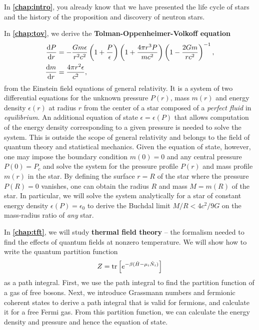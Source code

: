 In \textbf{\cref{chap:intro}}, you already know that we have presented the life cycle of stars and the history of the proposition and discovery of neutron stars.

In \textbf{\cref{chap:tov}}, we derive the \textbf{Tolman-Oppenheimer-Volkoff equation}
\begin{align*}
	\odv{P}{r} &= -\frac{G m \epsilon}{r^2 c^2} \left( 1 + \frac{P}{\epsilon} \right) \left( 1 + \frac{4 \pi r^3 P}{m c^2} \right) \left( 1 - \frac{2 G m}{r c^2} \right)^{-1} , \\
	\odv{m}{r} &= \frac{4 \pi r^2 \epsilon}{c^2} ,
\end{align*}
from the Einstein field equations of general relativity.
It is a system of two differential equations for the unknown pressure $P(r)$, mass $m(r)$ and energy density $\epsilon(r)$ at radius $r$ from the center of a star composed of a \emph{perfect fluid} in \emph{equilibrium}.
An additional equation of state $\epsilon = \epsilon(P)$ that allows computation of the energy density corresponding to a given pressure is needed to solve the system.
This is outside the scope of general relativity and belongs to the field of quantum theory and statistical mechanics.
Given the equation of state, however, one may impose the boundary condition $m(0) = 0$ and any central pressure $P(0) = P_c$ and solve the system for the pressure profile $P(r)$ and mass profile $m(r)$ in the star.
By defining the surface $r=R$ of the star where the pressure $P(R) = 0$ vanishes, one can obtain the radius $R$ and mass $M = m(R)$ of the star.
In particular, we will solve the system analytically for a star of constant energy density $\epsilon(P) = \epsilon_0$ to derive the Buchdal limit $M/R < 4 c^2 / 9 G$ on the mass-radius ratio of \emph{any} star.

In \textbf{\cref{chap:tft}}, we will study \textbf{thermal field theory} -- the formalism needed to find the effects of quantum fields at nonzero temperature.
We will show how to write the quantum partition function
\begin{equation*}
	Z = \operatorname{tr} \left[ e^{-\beta(\hat{H} - \mu_i \hat{N}_i)} \right]
\end{equation*}
as a path integral.
First, we use the path integral to find the partition function of a gas of free bosons.
Next, we introduce Grassmann numbers and fermionic coherent states to derive a path integral that is valid for fermions, and calculate it for a free Fermi gas.
From this partition function, we can calculate the energy density and pressure and hence the equation of state.

